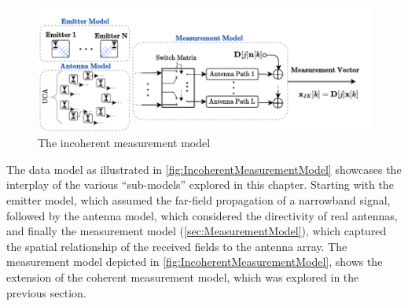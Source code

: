 \begin{figure}[H]
    \centering
    \includegraphics[width=1\textwidth]{figures/02_SignalModel/meas_model.pdf}
    \caption{The incoherent measurement model}
    \label{fig:IncoherentMeasurementModel}
\end{figure}

The data model as illustrated in \autoref{fig:IncoherentMeasurementModel} showcases the interplay of the various
``sub-models'' explored in this chapter. Starting with the emitter model, which assumed the far-field propagation of
a narrowband signal, followed by the antenna model, which considered the directivity of real antennas, and finally
the measurement model (\autoref{sec:MeasurementModel}), which captured the spatial relationship of the received
fields to the antenna array. The measurement model depicted in \autoref{fig:IncoherentMeasurementModel}, shows the
extension of the coherent measurement model, which was explored in the previous section.


\endinput




